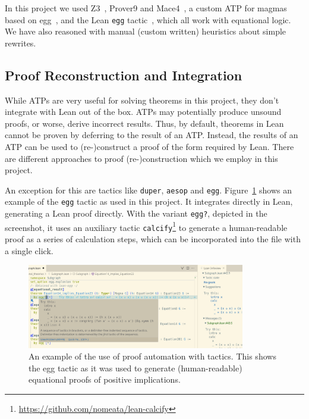 In this project we used Z3~\cite{DBLP:conf/tacas/MouraB08}, Prover9 and Mace4~\cite{prover9-mace4}, a custom ATP for magmas based on egg~\cite{DBLP:journals/pacmpl/WillseyNWFTP21}, and the Lean \texttt{egg} tactic~\cite{DBLP:journals/pacmpl/KoehlerGBGTS24,rossel2024equality,rossel2024bridging}, which all work with equational logic. We have also reasoned with manual (custom written) heuristics about simple rewrites.

\subsection{Proof Reconstruction and Integration}
\label{sec:proof-reconstruction}


While ATPs are very useful for solving theorems in this project, they don't integrate with Lean out of the box.
ATPs may potentially produce unsound proofs, or worse, derive incorrect results.
Thus, by default, theorems in Lean cannot be proven by deferring to the result of an ATP.
Instead, the results of an ATP can be used to (re-)construct a proof of the form required by Lean.
There are different approaches to proof (re-)construction which we employ in this project.



An exception for this are tactics like \texttt{duper}, \texttt{aesop} and \texttt{egg}. Figure~\ref{fig:screenshot-egg} shows an example of the \texttt{egg} tactic as used in this project. It integrates directly in Lean, generating a Lean proof directly. With the variant \texttt{egg?}, depicted in the screenshot, it uses an auxiliary tactic \texttt{calcify}\footnote{\url{https://github.com/nomeata/lean-calcify}} to generate a human-readable proof as a series of calculation steps, which can be incorporated into the file with a single click.

\begin{figure}
  \centering
  \includegraphics[width=0.85\textwidth]{screenshot-egg.png}
  \caption{An example of the use of proof automation with tactics. This shows the egg tactic as it was used to generate (human-readable) equational proofs of positive implications.}
  \label{fig:screenshot-egg}
\end{figure}

